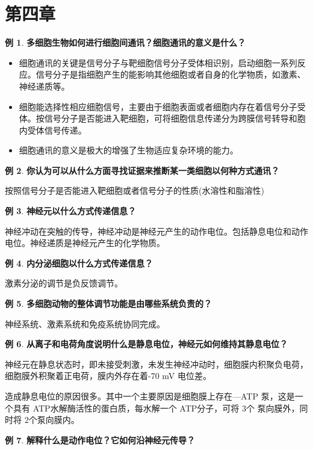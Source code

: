 \documentclass[UTF8]{article}
\theoremstyle{definition}
\newtheorem{example}{例}[section]
\begin{document}
\section{第四章}
\begin{example}\textbf{多细胞生物如何进行细胞间通讯？细胞通讯的意义是什么？}
    
    \begin{itemize}
        \item 细胞通讯的关键是信号分子与靶细胞信号分子受体相识别，启动细胞一系列反应。信号分子是指细胞产生的能影响其他细胞或者自身的化学物质，如激素、神经递质等。
        \item 细胞能选择性相应细胞信号，主要由于细胞表面或者细胞内存在着信号分子受体。按信号分子是否能进入靶细胞，可将细胞信息传递分为跨膜信号转导和胞内受体信号传递。
        \item 细胞通讯的意义是极大的增强了生物适应复杂环境的能力。
    \end{itemize}
\end{example}\begin{example}\textbf{你认为可以从什么方面寻找证据来推断某一类细胞以何种方式通讯？}
    
    按照信号分子是否能进入靶细胞或者信号分子的性质(水溶性和脂溶性)
\end{example}\begin{example}\textbf{神经元以什么方式传递信息？}
    
    神经冲动在突触的传导，神经冲动是神经元产生的动作电位。包括静息电位和动作电位。神经递质是神经元产生的化学物质。
\end{example}\begin{example}\textbf{内分泌细胞以什么方式传递信息？}

    激素分泌的调节是负反馈调节。
\end{example}\begin{example}\textbf{多细胞动物的整体调节功能是由哪些系统负责的？}
    
    神经系统、激素系统和免疫系统协同完成。
\end{example}\begin{example}\textbf{从离子和电荷角度说明什么是静息电位，神经元如何维持其静息电位？}
    
    神经元在静息状态时，即未接受刺激，未发生神经冲动时，细胞膜内积聚负电荷，细胞膜外积聚着正电荷，膜内外存在着-70 mV 电位差。
    
    造成静息电位的原因很多。其中一个主要原因是细胞膜上存在---ATP 泵，这是一个具有 ATP水解酶活性的蛋白质，每水解一个 ATP分子，可将 3个 泵向膜外，同时将 2个泵向膜内。
\end{example}\begin{example}\textbf{解释什么是动作电位？它如何沿神经元传导？}
    

\end{example}
\end{document}
